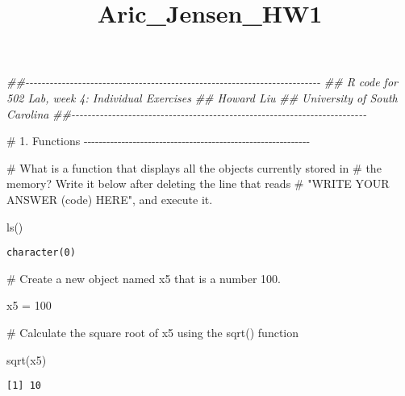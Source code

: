 \documentclass[
  letterpaper,
  DIV=11,
  numbers=noendperiod]{scrartcl}
\title{Aric\_Jensen\_HW1}
\author{}
\date{}
\newenvironment{Shaded}{\begin{snugshade}}{\end{snugshade}}
\newcommand{\CommentTok}[1]{\textcolor[rgb]{0.37,0.37,0.37}{#1}}
\newcommand{\DecValTok}[1]{\textcolor[rgb]{0.68,0.00,0.00}{#1}}
\newcommand{\DocumentationTok}[1]{\textcolor[rgb]{0.37,0.37,0.37}{\textit{#1}}}
\newcommand{\FunctionTok}[1]{\textcolor[rgb]{0.28,0.35,0.67}{#1}}
\newcommand{\NormalTok}[1]{\textcolor[rgb]{0.00,0.23,0.31}{#1}}
\newcommand{\OtherTok}[1]{\textcolor[rgb]{0.00,0.23,0.31}{#1}}
\begin{document}
\maketitle


\begin{Shaded}
\begin{Highlighting}[]
\DocumentationTok{\#\#{-}{-}{-}{-}{-}{-}{-}{-}{-}{-}{-}{-}{-}{-}{-}{-}{-}{-}{-}{-}{-}{-}{-}{-}{-}{-}{-}{-}{-}{-}{-}{-}{-}{-}{-}{-}{-}{-}{-}{-}{-}{-}{-}{-}{-}{-}{-}{-}{-}{-}{-}{-}{-}{-}{-}{-}{-}{-}{-}{-}{-}{-}{-}{-}{-}{-}{-}{-}{-}{-}{-}{-}{-}}
\DocumentationTok{\#\# R code for 502 Lab, week 4: Individual Exercises}
\DocumentationTok{\#\# Howard Liu}
\DocumentationTok{\#\# University of South Carolina}
\DocumentationTok{\#\#{-}{-}{-}{-}{-}{-}{-}{-}{-}{-}{-}{-}{-}{-}{-}{-}{-}{-}{-}{-}{-}{-}{-}{-}{-}{-}{-}{-}{-}{-}{-}{-}{-}{-}{-}{-}{-}{-}{-}{-}{-}{-}{-}{-}{-}{-}{-}{-}{-}{-}{-}{-}{-}{-}{-}{-}{-}{-}{-}{-}{-}{-}{-}{-}{-}{-}{-}{-}{-}{-}{-}{-}{-}}




\CommentTok{\# 1. Functions {-}{-}{-}{-}{-}{-}{-}{-}{-}{-}{-}{-}{-}{-}{-}{-}{-}{-}{-}{-}{-}{-}{-}{-}{-}{-}{-}{-}{-}{-}{-}{-}{-}{-}{-}{-}{-}{-}{-}{-}{-}{-}{-}{-}{-}{-}{-}{-}{-}{-}{-}{-}{-}{-}{-}{-}{-}{-}{-}{-}}


\CommentTok{\# What is a function that displays all the objects currently stored in }
\CommentTok{\# the memory? Write it below after deleting the line that reads }
\CommentTok{\# "WRITE YOUR ANSWER (code) HERE", and execute it. }


\FunctionTok{ls}\NormalTok{()}
\end{Highlighting}
\end{Shaded}

\begin{verbatim}
character(0)
\end{verbatim}

\begin{Shaded}
\begin{Highlighting}[]
\CommentTok{\# Create a new object named x5 that is a number 100. }


\NormalTok{x5 }\OtherTok{=} \DecValTok{100}

\CommentTok{\# Calculate the square root of x5 using the sqrt() function}


\FunctionTok{sqrt}\NormalTok{(x5)}
\end{Highlighting}
\end{Shaded}

\begin{verbatim}
[1] 10
\end{verbatim}
\end{document}
